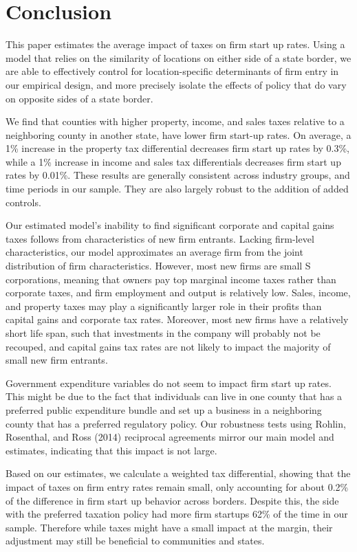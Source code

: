 \documentclass[12pt,a4paper]{article}
\begin{document}
\section{Conclusion}

This paper estimates the average impact of taxes on firm start up rates. Using a model that relies on the similarity of locations on either side of a state border, we are able to effectively control for location-specific determinants of firm entry in our empirical design, and more precisely isolate the effects of policy  that do vary on opposite sides of a state border. 

We find that counties with higher property, income, and sales taxes relative to a neighboring county in another state, have lower firm start-up rates. On average, a 1\% increase in the property tax differential decreases firm start up rates by 0.3\%, while a 1\% increase in income and sales tax differentials decreases firm start up rates by 0.01\%.   These results are generally consistent across industry groups, and time periods in our sample.  They are also largely robust to the addition of added controls.

Our estimated model’s inability to find significant corporate and capital gains taxes follows from characteristics of new firm entrants. Lacking firm-level characteristics, our model approximates an average firm from the joint distribution of firm characteristics. However, most new firms are small S corporations, meaning that owners pay top marginal income taxes rather than corporate taxes, and firm employment and output is relatively low. Sales, income, and property taxes may play a significantly larger role in their profits than capital gains and corporate tax rates. Moreover, most new firms have a relatively short life span, such that investments in the company will probably not be recouped, and capital gains tax rates are not likely to impact the majority of small new firm entrants. 

Government expenditure variables do not seem to impact firm start up rates. This might be due to the fact that individuals can live in one county that has a preferred public expenditure bundle and set up a business in a neighboring county that has a preferred regulatory policy. Our robustness tests using Rohlin, Rosenthal, and Ross (2014) reciprocal agreements mirror our main model and estimates, indicating that this impact is not large.

Based on our estimates, we calculate a weighted tax differential, showing that the impact of taxes on firm entry rates remain small, only accounting for about 0.2\% of the difference in firm start up behavior across borders. Despite this, the side with the preferred taxation policy had more firm startups 62\% of the time in our sample. Therefore while taxes might have a small impact at the margin, their adjustment may still be beneficial to communities and states. 
\end{document}
